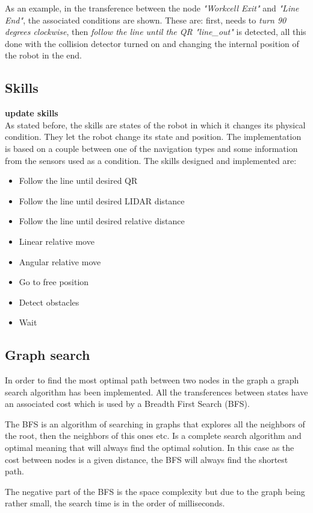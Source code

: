     As an example, in the transference between the node \emph{"Workcell Exit"} and \emph{"Line End"}, the associated conditions are shown. 
    These are: first, needs to \emph{turn 90 degrees clockwise}, then \emph{follow the line until the QR "line\_out"} is detected, all this done with the collision detector turned on and changing the internal position of the robot in the end.

    \subsection{Skills} %
    \label{sub:skills}
    \textbf{update skills}\\
    As stated before, the skills are states of the robot in which it changes its physical condition.
    They let the robot change its state and position.
    The implementation is based on a couple between one of the navigation types and some information from the sensors used as a condition.
    The skills designed and implemented are:
    \begin{itemize}
        \item Follow the line until desired QR
        \item Follow the line until desired LIDAR distance
        \item Follow the line until desired relative distance
        \item Linear relative move
        \item Angular relative move
        \item Go to free position
        \item Detect obstacles
        \item Wait
    \end{itemize}

    \subsection{Graph search} %
    \label{sub:mr_graph_search}
    In order to find the most optimal path between two nodes in the graph a graph search algorithm has been implemented.
    All the transferences between states have an associated cost which is used by a Breadth First Search (BFS).

    The BFS is an algorithm of searching in graphs that explores all the neighbors of the root, then the neighbors of this ones etc.
    Is a complete search algorithm and optimal meaning that will always find the optimal solution.
    In this case as the cost between nodes is a given distance, the BFS will always find the shortest path.
    
    The negative part of the BFS is the space complexity but due to the graph being rather small, the search time is in the order of milliseconds.
